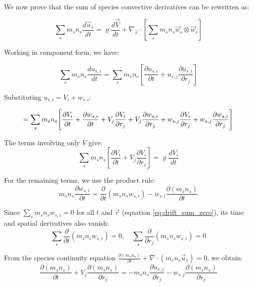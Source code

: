 We now prove that the sum of species convective derivatives can be rewritten as:

\begin{equation}
\sum_s m_s n_s \frac{d\vec{u}_s}{dt} = \varrho \frac{d\vec{V}}{dt} + \nabla_{\vec{r}} \cdot \left[\sum_s m_s n_s \vec{w}_s \otimes \vec{w}_s\right]
\label{eq:key_identity}
\end{equation}


Working in component form, we have:

\begin{equation*}
\sum_s m_s n_s \frac{du_{s,i}}{dt} = \sum_s m_s n_s \left[\frac{\partial u_{s,i}}{\partial t} + u_{s,j} \frac{\partial u_{s,i}}{\partial r_j}\right]
\end{equation*}

Substituting $u_{s,i} = V_i + w_{s,i}$:

\begin{equation*}
= \sum_s m_s n_s \Bigg[\frac{\partial V_i}{\partial t} + \frac{\partial w_{s,i}}{\partial t} + V_j \frac{\partial V_i}{\partial r_j} + V_j \frac{\partial w_{s,i}}{\partial r_j} \\
+ w_{s,j} \frac{\partial V_i}{\partial r_j} + w_{s,j} \frac{\partial w_{s,i}}{\partial r_j}\Bigg]
\end{equation*}

The terms involving only $V$ give:
\begin{equation*}
\sum_s m_s n_s \left[\frac{\partial V_i}{\partial t} + V_j \frac{\partial V_i}{\partial r_j}\right] = \varrho \frac{dV_i}{dt}
\end{equation*}

For the remaining terms, we use the product rule:
\begin{equation*}
m_s n_s \frac{\partial w_{s,i}}{\partial t} = \frac{\partial}{\partial t}(m_s n_s w_{s,i}) - w_{s,i} \frac{\partial (m_s n_s)}{\partial t}
\end{equation*}

Since $\sum_s m_s n_s w_{s,i} = 0$ for all $t$ and $\vec{r}$ (equation \ref{eq:drift_sum_zero}), its time and spatial derivatives also vanish:
\begin{equation*}
\sum_s \frac{\partial}{\partial t}(m_s n_s w_{s,i}) = 0, \quad \sum_s \frac{\partial}{\partial r_j}(m_s n_s w_{s,i}) = 0
\end{equation*}

From the species continuity equation $\frac{\partial (m_s n_s)}{\partial t} + \nabla \cdot (m_s n_s \vec{u}_s) = 0$, we obtain:
\begin{equation*}
\frac{\partial (m_s n_s)}{\partial t} + V_j \frac{\partial (m_s n_s)}{\partial r_j} = -m_s n_s \frac{\partial u_{s,j}}{\partial r_j} - w_{s,j} \frac{\partial (m_s n_s)}{\partial r_j}
\end{equation*}

